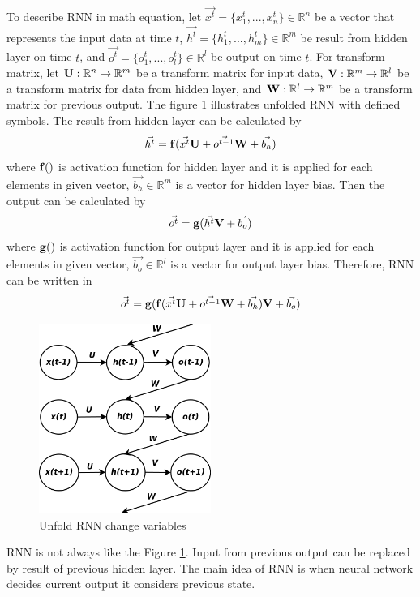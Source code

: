 \documentclass[draft,dvipsnames]{drexel-thesis}
\begin{document}
\begin{thesis}
\begin{enumerate}
	To describe RNN in math equation, let $\vec{x^t} = \{ x_1^t, ..., x_n^t\} \in \mathbb{R}^n$ be a vector that represents the input data at time $t$, $\vec{h^t} = \{ h_1^t, ..., h_m^t\} \in \mathbb{R}^m$ be result from hidden layer on time $t$, and $\vec{o^t} = \{ o_1^t, ..., o_l^t\} \in \mathbb{R}^l$ be output on time $t$. For transform matrix, let $\bold{U}: \mathbb{R}^n \rightarrow \mathbb{R}^m$ be a transform matrix for input data, $\bold{V}: \mathbb{R}^m \rightarrow \mathbb{R}^l$ be a transform matrix for data from hidden layer, and $\bold{W}: \mathbb{R}^l \rightarrow \mathbb{R}^m$ be a transform matrix for previous output. The figure \ref{fig:unfold_RNN} illustrates unfolded RNN with defined symbols. The result from hidden layer can be calculated by 
	$$\vec{h^t} = \bold{f}(\vec{x^t}\bold{U} + \vec{o^{t-1}}\bold{W} + \vec{b_h})$$ where $\bold{f}()$ is activation function for hidden layer and it is applied for each elements in given vector, $\vec{b_h} \in \mathbb{R}^m$ is a vector for hidden layer bias. Then the output can be calculated by
	$$\vec{o^t} = \bold{g}(\vec{h^t}\bold{V}+\vec{b_o})$$ where $\bold{g}()$ is activation function for output layer and it is applied for each elements in given vector, $\vec{b_o} \in \mathbb{R}^l$ is a vector for output layer bias. Therefore, RNN can be written in
	$$\vec{o^t} = \bold{g}(\bold{f}(\vec{x^t}\bold{U} + \vec{o^{t-1}}\bold{W} + \vec{b_h})\bold{V}+\vec{b_o})$$
	
\begin{figure}[t!]
    \centering
    \includegraphics[width=0.5\textwidth]{pictures/figures/unfold_RNN.png}
    \caption{Unfold RNN {\color{red} change variables}}
    \label{fig:unfold_RNN}
\end{figure}

	RNN is not always like the Figure \ref{fig:unfold_RNN}. Input from previous output can be replaced by result of previous hidden layer. The main idea of RNN is when neural network decides current output it considers previous state.
	


\end{enumerate}
\end{thesis}
\end{document}
